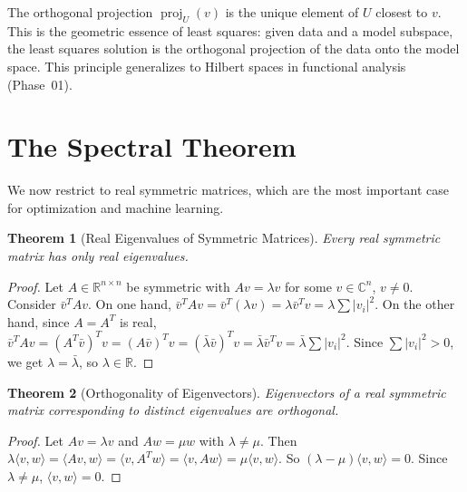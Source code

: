\documentclass[11pt,a4paper]{article}
\theoremstyle{definition}
\theoremstyle{plain}
\newtheorem{theorem}{Theorem}[section]
\theoremstyle{remark}
\newcommand{\R}{\mathbb{R}}
\newcommand{\C}{\mathbb{C}}
\DeclareMathOperator{\proj}{proj}
\begin{document}
\begin{keyresult}
The orthogonal projection $\proj_U(v)$ is the unique element of $U$ closest to $v$.
This is the geometric essence of least squares: given data and a model subspace, the least
squares solution is the orthogonal projection of the data onto the model space. This principle
generalizes to Hilbert spaces in functional analysis (Phase~01).
\end{keyresult}

\section{The Spectral Theorem}
\label{sec:spectral}

We now restrict to real symmetric matrices, which are the most important case for
optimization and machine learning.

\begin{theorem}[Real Eigenvalues of Symmetric Matrices]
\label{thm:symmetric_real_eigenvalues}
Every real symmetric matrix has only real eigenvalues.
\end{theorem}

\begin{proof}
Let $A \in \R^{n \times n}$ be symmetric with $Av = \lambda v$ for some $v \in \C^n$,
$v \neq 0$. Consider $\bar{v}^T A v$. On one hand,
$\bar{v}^T A v = \bar{v}^T (\lambda v) = \lambda \bar{v}^T v = \lambda \sum |v_i|^2$.
On the other hand, since $A = A^T$ is real,
$\bar{v}^T A v = (A^T \bar{v})^T v = (A\bar{v})^T v = (\bar{\lambda}\bar{v})^T v
= \bar{\lambda} \bar{v}^T v = \bar{\lambda} \sum |v_i|^2$.
Since $\sum |v_i|^2 > 0$, we get $\lambda = \bar{\lambda}$, so $\lambda \in \R$.
\end{proof}

\begin{theorem}[Orthogonality of Eigenvectors]
\label{thm:symmetric_orthogonal_eigenvectors}
Eigenvectors of a real symmetric matrix corresponding to distinct eigenvalues are orthogonal.
\end{theorem}

\begin{proof}
Let $Av = \lambda v$ and $Aw = \mu w$ with $\lambda \neq \mu$. Then
$\lambda \langle v, w \rangle = \langle Av, w \rangle = \langle v, A^T w \rangle
= \langle v, Aw \rangle = \mu \langle v, w \rangle$.
So $(\lambda - \mu)\langle v, w \rangle = 0$. Since $\lambda \neq \mu$,
$\langle v, w \rangle = 0$.
\end{proof}
\end{document}
